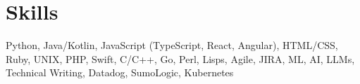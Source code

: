 \documentclass[10pt, a4paper]{article}
\begin{document}
\vspace{-7mm}
\section*{Skills}
Python, Java/Kotlin, JavaScript (TypeScript, React, Angular), HTML/CSS, Ruby, UNIX, PHP, Swift, C/C++, Go, Perl, Lisps, Agile, JIRA, ML, AI, LLMs, Technical Writing, Datadog, SumoLogic, Kubernetes\\
\end{document}
